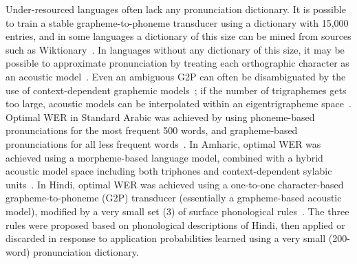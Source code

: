 Under-resourced languages often lack any pronunciation dictionary.  It
is possible to train a stable grapheme-to-phoneme transducer using a
dictionary with 15,000 entries, and in some languages a dictionary of
this size can be mined from sources such as
Wiktionary~\cite{Schlippe2014}.  In languages without any dictionary
of this size, it may be possible to approximate pronunciation by
treating each orthographic character as an acoustic 
model~\cite{Kanthak2002,Charoenpornsawat06,Gizaw2008,Le2009}.
Even an ambiguous G2P can often be disambiguated by the use of
context-dependent graphemic models~\cite{Kanthak2002}; if the number
of trigraphemes gets too large, acoustic models can be interpolated
within an eigentrigrapheme space~\cite{Ko2014}.  Optimal WER in
Standard Arabic was achieved by using phoneme-based pronunciations for
the most frequent 500 words, and grapheme-based pronunciations for all
less frequent words~\cite{Elmahdy2012}.  In Amharic, optimal WER was
achieved using a morpheme-based language model, combined with a hybrid
acoustic model space including both triphones and context-dependent
sylabic units~\cite{Tachbelie2014}.  In Hindi, optimal WER was
achieved using a one-to-one character-based grapheme-to-phoneme (G2P)
transducer (essentially a grapheme-based acoustic model), modified by
a very small set (3) of surface phonological
rules~\cite{Jyothi2015interspeech_hindi}.  The three rules were
proposed based on phonological descriptions of Hindi, then applied or
discarded in response to application probabilities learned using a
very small (200-word) pronunciation dictionary.

